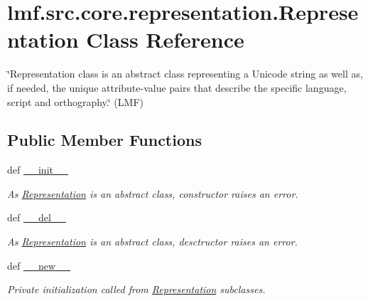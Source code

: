\hypertarget{classlmf_1_1src_1_1core_1_1representation_1_1_representation}{\section{lmf.\+src.\+core.\+representation.\+Representation Class Reference}
\label{classlmf_1_1src_1_1core_1_1representation_1_1_representation}
}


\char`\"{}\+Representation class is an abstract class representing a Unicode string as well as, if needed, the unique attribute-\/value pairs that describe the specific language, script and orthography.\char`\"{} (L\+M\+F)  


\subsection*{Public Member Functions}
\begin{DoxyCompactItemize}
\item 
def \hyperlink{classlmf_1_1src_1_1core_1_1representation_1_1_representation_acd1be9562ebfd01660301f22ee57a50c}{\+\_\+\+\_\+init\+\_\+\+\_\+}
\begin{DoxyCompactList}\small\item\em As \hyperlink{classlmf_1_1src_1_1core_1_1representation_1_1_representation}{Representation} is an abstract class, constructor raises an error. \end{DoxyCompactList}\item 
def \hyperlink{classlmf_1_1src_1_1core_1_1representation_1_1_representation_aac0e09b6c37690ed70a51981cd5b251d}{\+\_\+\+\_\+del\+\_\+\+\_\+}
\begin{DoxyCompactList}\small\item\em As \hyperlink{classlmf_1_1src_1_1core_1_1representation_1_1_representation}{Representation} is an abstract class, desctructor raises an error. \end{DoxyCompactList}\item 
def \hyperlink{classlmf_1_1src_1_1core_1_1representation_1_1_representation_ac592206f4f5af84f6a03af40f36ebffa}{\+\_\+\+\_\+new\+\_\+\+\_\+}
\begin{DoxyCompactList}\small\item\em Private initialization called from \hyperlink{classlmf_1_1src_1_1core_1_1representation_1_1_representation}{Representation} subclasses. \end{DoxyCompactList}\end{DoxyCompactItemize}
